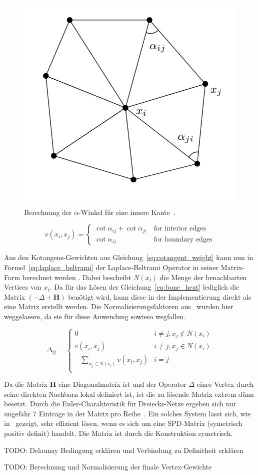 \begin{figure}[h!]
	\centering
	\includegraphics[width=0.4\linewidth]{resources/img/cotangent_approx.png}
	\caption{Berechnung der $\alpha$-Winkel für eine innere Kante~\cite{laplace_beltrami_paper}.}
	\label{fig:cotangent_approx}
\end{figure}

\begin{equation}
    \label{eq:cotangent_weight}
    v(x_i,x_j) = 
        \begin{cases}
            \cot{\alpha_{ij}}+\cot{\alpha_{ji}}\ & \text{for interior edges} \\
            \cot{\alpha_{ij}} & \text{for boundary edges}
        \end{cases}
\end{equation}

Aus den Kotangens-Gewichten aus Gleichung~\ref{eq:cotangent_weight} kann nun in Formel~\ref{eq:laplace_beltrami} der Laplace-Beltrami Operator in seiner Matrix-Form berechnet werden \cite{spd_solver_paper,laplace_beltrami_paper}. Dabei bescheibt $N(x_i)$ die Menge der benachbarten Vertices von $x_i$. Da für das Lösen der Gleichung~\ref{eq:bone_heat} lediglich die Matrix $(-\Delta+\textbf{H})$ benötigt wird, kann diese in der Implementierung direkt als eine Matrix erstellt werden. Die Normalisierungsfaktoren aus~\cite{spd_solver_paper} wurden hier weggelassen, da sie für diese Anwendung sowieso wegfallen.

\begin{equation}
    \label{eq:laplace_beltrami}
    \Delta_{ij}=
    \begin{cases}
        0 & i \neq j, x_j \notin N(x_i) \\
        v(x_i,x_j) & i \neq j, x_j \in N(x_i) \\
        -\sum_{x_j\in N(v_i)} v(x_i,x_j) & i = j\\
    \end{cases}
\end{equation}

Da die Matrix $\textbf{H}$ eine Diagonalmatrix ist und der Operator $\Delta$ eines Vertex durch seine direkten Nachbarn lokal definiert ist, ist die zu lösende Matrix extrem dünn besetzt. Durch die Euler-Charakteristik für Dreiecks-Netze ergeben sich nur ungefähr $7$ Einträge in der Matrix pro Reihe~\cite{spd_solver_paper}. Ein solches System lässt sich, wie in~\cite{spd_solver_paper} gezeigt, sehr effizient lösen, wenn es sich um eine SPD-Matrix (symetrisch positiv definit) handelt. Die Matrix ist durch die Konstruktion symetrisch. 

TODO: Delaunay Bedingung erklären und Verbindung zu Definitheit erklären

TODO: Berechnung und Normalisierung der finale Vertex-Gewichte
